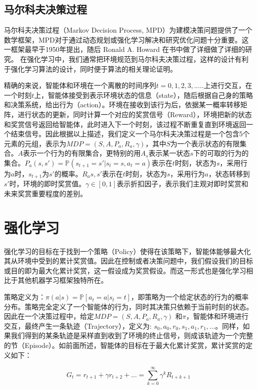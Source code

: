 \documentclass{standalone}
\begin{document}
\subsection{马尔科夫决策过程}
马尔科夫决策过程（Markov Decision Process, MPD）为建模决策问题提供了一个数学框架，MPD对于通过动态规划或强化学习解决和研究优化问题十分重要。这一框架最早于1950年提出，随后 Ronald A. Howard 在书中做了详细做了详细的研究。
在强化学习中，我们通常把环境规范到马尔科夫决策过程，这样的设计有利于强化学习算法的设计，同时便于算法的相关理论证明。\par
精确的来说，智能体和环境在一个离散的时间序列$t=0,1,2,3,... ..$上进行交互，在一个时刻$t$上，智能体接受到表示环境状态的信息（state），随后根据自己身的策略和决策系统，给出行为（action）。环境在接收到该行为后，依据某一概率转移矩阵，进行状态的更新，同时计算一个对应的奖赏信号（Reward），环境把新的状态和奖赏信号返回给智能体，此时进入下一个时刻，该过程不断重复直到环境返回一个结束信号。因此根据以上描述，我们定义一个马尔科夫决策过程是一个包含5个元素的元组，表示为$MDP=(S, A, P_{a}, R_{a}, \gamma)$，其中$S$为一个表示状态的有限集合。$A$表示一个行为的有限集合，更特别的用$A_s$表示某一状态$s$下的可取的行为的集合。$P_a(s, s') = \mathbb{P}(s_{t+1} = s'|s_t = s, a_t=a)$表示在$t$时刻，状态为$s$，采用行为$a$时，$s_{t+1}$为$s'$的概率。$R_a{s, s'}$表示在$t$时刻，状态为$s$，采用行为$a$，状态转移到$s'$时，环境的即时奖赏值。$\gamma \in [0, 1]$表示折扣因子，表示我们主观对即时奖赏和未来奖赏重要程度的差别。\par 

\section{强化学习}
强化学习的目标在于找到一个策略（Policy）使得在该策略下，智能体能够最大化其从环境中受到的累计奖赏值。因此在控制或者决策问题中，我们假设我们的目标或目的即为最大化累计奖赏，这一假设成为奖赏假设。而这一形式也是强化学习相比于其他机器学习框架独特所在。\par
策略定义为：$\pi(a|s) = \mathbb{P}[a_t=a | s_t=t]$，即策略为一个给定状态的行为的概率分布。策略完全定义了一个智能体的行为，同时其决策只依赖于当前时刻的状态。
因此在一个决策过程中，给定$MDP=(S, A, P_{a}, R_{a}, \gamma)$ 和$\pi$，智能体和环境进行交互，最终产生一条轨迹（Trajectory），定义为: $s_0, a_0, r_0, s_1, a_1, r_1, ...$。同样，如果我们得到的某条轨迹是采样直到收到了环境的终止信号，则成该轨迹为一个完整的节（Episode）。如前面所述，智能体的目标在于最大化累计奖赏，累计奖赏的定义如下：
\begin{center}
    \begin{equation}
        G_t=r_{t+1} + \gamma r_{t+2}+... = \sum_{k=0}^{\infty}\gamma^{k}R_{t+k+1}
    \end{equation}
\end{center}
\end{document}
